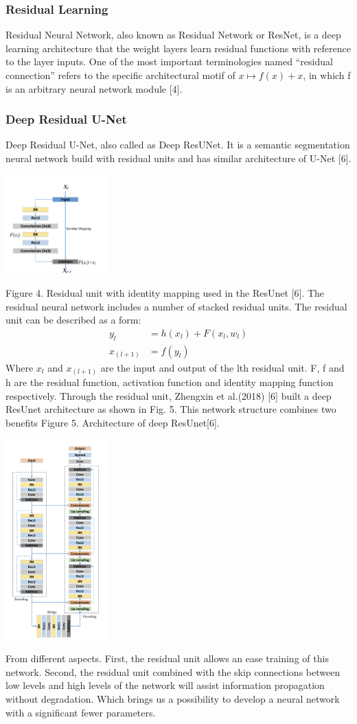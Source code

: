 \documentclass[conference]{IEEEtran}
\begin{document}
\subsubsection{Residual Learning}
Residual Neural Network, also known as Residual Network or ResNet, is a deep learning architecture that the weight layers learn residual functions with reference to the layer inputs. One of the most important terminologies named “residual connection” refers to the specific architectural motif of $x↦f(x)+x$, in which f is an arbitrary neural network module [4].
\subsubsection{Deep Residual U-Net}
Deep Residual U-Net, also called as Deep ResUNet. It is a semantic segmentation neural network build with residual units and has similar architecture of U-Net [6].
\centerline{\includegraphics[width=40mm,scale=0.5]{group/Picture5.png}}
Figure 4. Residual unit with identity mapping used in the ResUnet [6].
The residual neural network includes a number of stacked residual units. The residual unit can be described as a form:
$$
\begin{aligned}
    y_l&=h(x_l)+F(x_l,w_l)\\
    x_(l+1)&=f(y_l)
\end{aligned}
$$
Where $x_l$ and $x_(l+1)$ are the input and output of the lth residual unit. F, f and h are the residual function, activation function and identity mapping function respectively.
Through the residual unit, Zhengxin et al.(2018) [6] built a deep ResUnet architecture as shown in Fig. 5. This network structure combines two benefits 
Figure 5. Architecture of deep ResUnet[6].
\centerline{\includegraphics[width=40mm,scale=0.5]{group/Picture6.png}}
From different aspects. First, the residual unit allows an ease training of this network. Second, the residual unit combined with the skip connections between low levels and high levels of the network will assist information propagation without degradation. Which brings us a possibility to develop a neural network with a significant fewer parameters.
\end{document}
